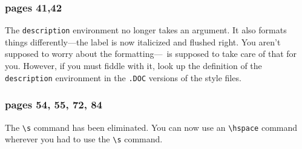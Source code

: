 \subsubsection* {pages 41,42} 
The \hbox{\tt description} environment no longer takes an argument.
It also formats things differently---the label is now italicized and
flushed right.  You aren't supposed to worry about the
formatting---\LATEX\ is supposed to take care of that for you.
However, if you must fiddle with it, look up the definition
of the \hbox{\verb"description"} environment in the {\tt .DOC}
versions of the style files.

\subsubsection*{pages 54, 55, 72, 84}
The \hbox{\verb"\s"} command has been eliminated.  You can now use
an \hbox{\verb"\hspace"} command wherever you had to use the \hbox{\verb"\s"}
command.

